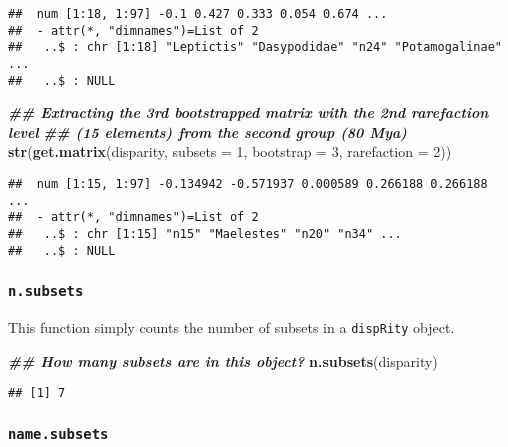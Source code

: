 \documentclass[
]{book}
\newenvironment{Shaded}{\begin{snugshade}}{\end{snugshade}}
\newcommand{\AttributeTok}[1]{\textcolor[rgb]{0.13,0.29,0.53}{#1}}
\newcommand{\DecValTok}[1]{\textcolor[rgb]{0.00,0.00,0.81}{#1}}
\newcommand{\DocumentationTok}[1]{\textcolor[rgb]{0.56,0.35,0.01}{\textbf{\textit{#1}}}}
\newcommand{\FunctionTok}[1]{\textcolor[rgb]{0.13,0.29,0.53}{\textbf{#1}}}
\newcommand{\NormalTok}[1]{#1}
\begin{document}
\begin{verbatim}
##  num [1:18, 1:97] -0.1 0.427 0.333 0.054 0.674 ...
##  - attr(*, "dimnames")=List of 2
##   ..$ : chr [1:18] "Leptictis" "Dasypodidae" "n24" "Potamogalinae" ...
##   ..$ : NULL
\end{verbatim}

\begin{Shaded}
\begin{Highlighting}[]
\DocumentationTok{\#\# Extracting the 3rd bootstrapped matrix with the 2nd rarefaction level}
\DocumentationTok{\#\# (15 elements) from the second group (80 Mya)}
\FunctionTok{str}\NormalTok{(}\FunctionTok{get.matrix}\NormalTok{(disparity, }\AttributeTok{subsets =} \DecValTok{1}\NormalTok{, }\AttributeTok{bootstrap =} \DecValTok{3}\NormalTok{, }\AttributeTok{rarefaction =} \DecValTok{2}\NormalTok{))}
\end{Highlighting}
\end{Shaded}

\begin{verbatim}
##  num [1:15, 1:97] -0.134942 -0.571937 0.000589 0.266188 0.266188 ...
##  - attr(*, "dimnames")=List of 2
##   ..$ : chr [1:15] "n15" "Maelestes" "n20" "n34" ...
##   ..$ : NULL
\end{verbatim}

\hypertarget{n.subsets}{%
\subsubsection{\texorpdfstring{\texttt{n.subsets}}{n.subsets}}\label{n.subsets}}

This function simply counts the number of subsets in a \texttt{dispRity} object.

\begin{Shaded}
\begin{Highlighting}[]
\DocumentationTok{\#\# How many subsets are in this object?}
\FunctionTok{n.subsets}\NormalTok{(disparity)}
\end{Highlighting}
\end{Shaded}

\begin{verbatim}
## [1] 7
\end{verbatim}

\hypertarget{name.subsets}{%
\subsubsection{\texorpdfstring{\texttt{name.subsets}}{name.subsets}}\label{name.subsets}}
\end{document}
